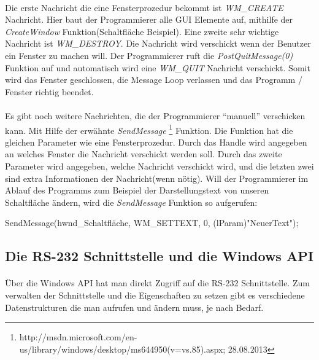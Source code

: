 \paragraph{}
Die erste Nachricht die eine Fensterprozedur bekommt ist \textit{WM\_CREATE} Nachricht. Hier baut der Programmierer alle GUI Elemente auf, mithilfe der \textit{CreateWindow} Funktion(Schaltfläche Beispiel). Eine zweite sehr wichtige Nachricht ist \textit{WM\_DESTROY}. Die Nachricht wird verschickt wenn der Benutzer ein Fenster zu machen will. Der Programmierer ruft die \textit{PostQuitMessage(0)} Funktion auf und automatisch wird eine \textit{WM\_QUIT} Nachricht verschickt. Somit wird das Fenster geschlossen, die Message Loop verlassen und das Programm / Fenster richtig beendet.

\paragraph{}
Es gibt noch weitere Nachrichten, die der Programmierer "`manuell"' verschicken kann. Mit Hilfe der erwähnte \textit{SendMessage} \footnote{http://msdn.microsoft.com/en-us/library/windows/desktop/ms644950(v=vs.85).aspx; 28.08.2013} Funktion. Die Funktion hat die gleichen Parameter wie eine Fensterprozedur. Durch das Handle wird angegeben an welches Fenster die Nachricht verschickt werden soll. Durch das zweite Parameter wird angegeben, welche Nachricht verschickt wird, und die letzten zwei sind extra Informationen der Nachricht(wenn nötig). Will der Programmierer im Ablauf des Programms zum Beispiel der Darstellungstext von unseren Schaltfläche ändern, wird die \textit{SendMessage} Funktion so aufgerufen:

\begin{center}
SendMessage(hwnd\_Schaltfläche, WM\_SETTEXT, 0, (lParam)"NeuerText");
\end{center}

\subsection{Die RS-232 Schnittstelle und die Windows API}\label{COMWINAPI}
\paragraph{}
Über die Windows API hat man direkt Zugriff auf die RS-232 Schnittstelle. Zum verwalten der Schnittstelle und die Eigenschaften zu setzen gibt es verschiedene Datenstrukturen die man aufrufen und ändern muss, je nach Bedarf.


